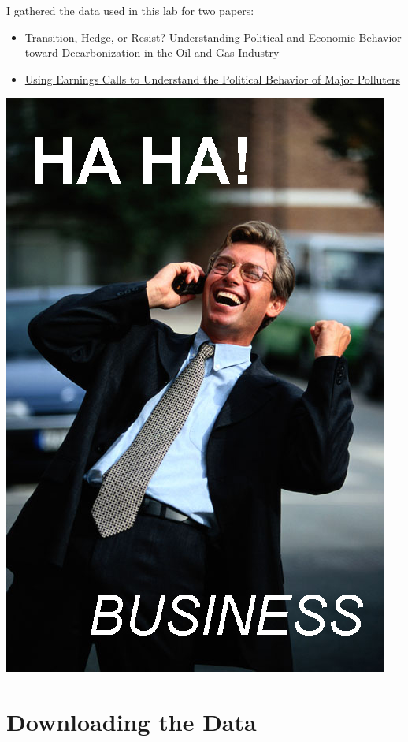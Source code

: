 \documentclass[
  letterpaper,
  DIV=11,
  numbers=noendperiod]{scrreprt}
\begin{document}
I gathered the data used in this lab for two papers:

\begin{itemize}
\item
  \href{https://discovery.ucl.ac.uk/id/eprint/10196075/1/ssrn-3694447.pdf}{Transition,
  Hedge, or Resist? Understanding Political and Economic Behavior toward
  Decarbonization in the Oil and Gas Industry}
\item
  \href{https://muse.jhu.edu/article/847625}{Using Earnings Calls to
  Understand the Political Behavior of Major Polluters}
\end{itemize}

\includegraphics{index_files/mediabag/business.jpg}

\hypertarget{downloading-the-data-1}{%
\section{Downloading the Data}\label{downloading-the-data-1}}
\end{document}
